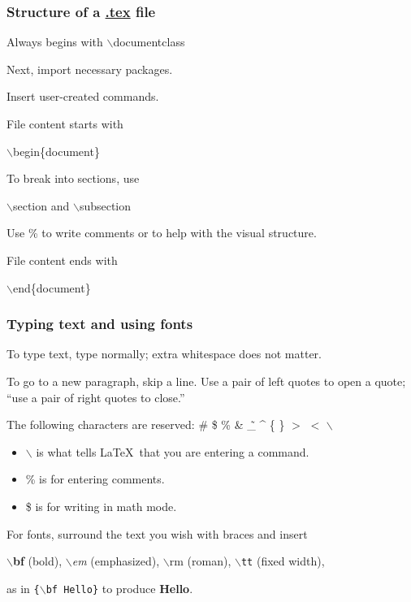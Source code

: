 \documentclass{beamer}  %
\newcommand{\bi}{\bigskip}  %
\newcommand{\med}{\medskip}  %
\newcommand{\sm}{\smallskip}  %
\begin{document}
\frame
{
\frametitle{Structure of a \url{.tex} file}


\vspace{-3in}\hspace{2.1in}\begin{minipage}{2.2in}
Always begins with {\color{red} $\backslash$documentclass}

\med
Next, import necessary packages.

\med
Insert user-created commands.

\bi\med
File content starts with

{\color{red} $\backslash$begin\{document\}}


\bi
To break into sections, use 

$\backslash$section and $\backslash$subsection

\bi
Use \% to write comments or to help with the visual structure.


\bi\med
File content ends with

{\color{red} $\backslash$end\{document\} }

\end{minipage}\!\!\!\!

}

\frame
{
\frametitle{Typing text and using fonts}

To type text, type normally;  extra whitespace       does    not 
matter.

To go to a new paragraph, skip a line.  Use a pair of left quotes to open a quote; ``use a pair of right quotes to close.''

\med
The following characters are reserved:
	\#	\$ 	\% 	\& 	\~ 	\_ 	\^{} 	\{ 	\} 	$>$ 	$<$ 	$\backslash$
	
\begin{itemize}
\item $\backslash$ is what tells \LaTeX\ that you are entering a command.
\item \% is for entering comments.
\item \$ is for writing in math mode.
\end{itemize}

\bi
For fonts, surround the text you wish with braces and insert\!\!\!

\sm
{\bf $\backslash$bf} (bold), 
{\em $\backslash$em} (emphasized), 
{\rm $\backslash$rm} (roman), 
{\tt $\backslash$tt} (fixed width), 

\sm
as in {\color{red} \tt \{$\backslash$bf Hello\}} to produce {\bf Hello}.

\vfill
}
\end{document}
